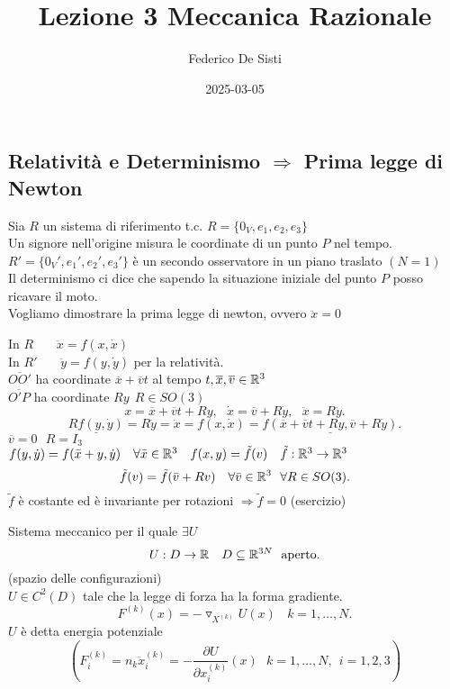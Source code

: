 \documentclass[12px]{article}
\title{Lezione 3 Meccanica Razionale}
\date{2025-03-05}
\author{Federico De Sisti}
\begin{document}
	\maketitle
	\newpage
	\subsection{Relatività e Determinismo $ \Rightarrow $ Prima legge di Newton}
	Sia $R$ un sistema di riferimento t.c.  $R = \{0_V, e_1,e_2,e_3\}$\\
	Un signore nell'origine misura le coordinate di un punto $P$ nel tempo.\\
	$R'=\{0_V', e_1',e_2',e_3'\}$ è un secondo osservatore in un piano traslato $(N=1)$\\
	Il determinismo ci dice che sapendo la situazione iniziale del punto  $P$ posso ricavare il moto.\\
	Vogliamo dimostrare la prima legge di newton, ovvero $\ddot x = 0$
	\begin{dimo}
 In $R$ \ \ \ $\ddot x = f(x,\dot x)$	\\
 In $R'$ \ \ \  $\ddot y = f(y,\dot y)$ per la relatività.\\
 $ \overline{OO'}$ ha coordinate $ \overline{x} + \overline{v}t$ al tempo $t, \overline{x}, \overline{v}\in\mathbb{R}^3$\\
 $ \overline{O'P}$ ha coordinate $Ry \ \ R\in SO(3)$\\
  \[
 x = \overline{x} + \overline{v}t + Ry, \ \ \ \dot x = \overline{v} + R\dot y, \ \ \ \ddot x = R\ddot y
 .\] 
 \[
	 \underline{Rf(y,\dot y)} = R\ddot y = \ddot x = f(x,\dot x) =\underline{ f( \overline{x} + \overline{v}t + Ry, \overline{v} + R\dot y)}
 .\] 
 $\overline v = 0 \ \ \ R = I_3$\\
  $f(y,\dot y ) = f(\bar x + y, \dot y) \ \ \ \forall \bar x \in \R^3 \ \ \ f(x,y) = \tilde f(v) \ \ \ \tilde f:\R^3 \rightarrow\R^3$\\
  \[
  \tilde f(v) = \tilde f ( \bar v + R v) \ \ \ \forall\bar v \in \R^3 \ \ \forall R\in SO(3)
  .\] 
  $\tilde f$ è costante ed è invariante per rotazioni $ \Rightarrow \tilde f = 0$ (esercizio) 
\end{dimo}
\begin{defi}
	Sistema meccanico per il quale $\exists U$\\
	 \[
		 U: D \rightarrow\mathbb{R} \ \ \ D\subseteq \mathbb{R}^{3N} \ \ \text{aperto}
	.\] 
	(spazio delle configurazioni)\\
	$U\in C^2(D)$ tale che la legge di forza ha la forma gradiente.\\
	 \[
		 F^{(k)}(x) = -\triangledown_{X^{(k)}}U(x) \ \ \ \ k = 1,\ldots, N
	.\] 
	$U$ è detta energia potenziale
	\[(F^{(k)}_i = n_k \ddot x^{(k)}_i = -\frac{\partial U}{\partial x_i^{(k)}}(x) \  \ \ k=1,\ldots,N, \ \ i=1,2,3) \]
\end{defi}
\end{document}
